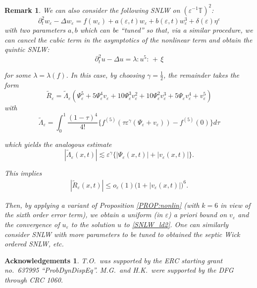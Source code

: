 \documentclass[letterpaper, 11pt,  reqno]{amsart}
\newtheorem{remark}[theorem]{Remark}
\newcommand{\1}{\hspace{0.5mm}\text{I}\hspace{0.5mm}}
\newcommand{\noi}{\noindent}
\newcommand{\T}{\mathbb{T}}
\newcommand{\Dl}{\Delta}
\newcommand{\eps}{\varepsilon}
\newcommand{\g}{\gamma}
\newcommand{\ld}{\lambda}
\newcommand{\Ld}{\Lambda}
\newcommand{\wt}{\widetilde}
\newcommand{\dt}{\partial_t}
\newcommand{\les}{\lesssim}
\newtheorem*{ackno}{Acknowledgements}
\numberwithin{equation}{section}
\numberwithin{theorem}{section}
\begin{document}
\begin{remark}\rm
We can also consider  the following  SNLW 
on $(\eps^{- 1} \T)^2$: 
\[ \dt^2 w_\eps- \Dl w_\eps  = f (w_\eps) + a (\eps, t) w_\eps 
+ b   (\eps, t) w_\eps^3 + \delta (\eps) \eta^\eps \]
  with two parameters $a, b$ which can be ``tuned'' 
  so that,  via a similar procedure, 
  we can cancel  the cubic term in the asymptotics of the nonlinear term 
  and obtain the  quintic SNLW: 
    \begin{equation}
\dt^2 u - \Dl  u = \lambda : \!u^5 \!: \, + \, \xi
    \label{SNLW_ld2}
  \end{equation}

\noi
for some $\ld = \ld(f)$.
  In this case, by choosing $\g = \frac 12$, 
    the remainder  takes the  form
  \[ \wt{R}_{\eps} = \wt{\Lambda}_{\eps} 
     (\Psi_{\eps}^5 + 5 \Psi_{\eps}^4 v_{\eps} + 10
     \Psi_{\eps}^3 v_{\eps}^2 + 10 \Psi_{\eps}^2
     v_{\eps}^3 + 5 \Psi_{\eps} v_{\eps}^4 +
     v_{\eps}^5) \]
  with
  \[ \wt{\Lambda}_{\eps} = \int_0^1 \frac{(1 - \tau)^4}{4!} 
     \big\{f^{(5)} (\tau \eps^{\gamma} (\Psi_{\eps} +
     v_{\eps})) - f^{(5)} (0)\big\} d \tau \]


\noi
  which yields the analogous estimate
  \[| \wt \Ld_\eps (x, t) | \les \eps^{\gamma} 
\big\{|    \Psi_{\eps} (x, t) | + | v_{\eps} (x, t) |\big\} .   \]
 
 \noi
 This implies
\begin{align*} | \wt R_{\eps} (x, t ) | \leq o_{\eps} (1) \big(1 + |   v_{\eps} (x, t) |\big)^6 . 
\end{align*}


 
 \noi
 Then, by applying 
 a variant of Proposition \ref{PROP:nonlin} 
(with $k = 6$ in view of the sixth order error term), 
 we obtain a uniform (in $\eps$) a priori bound on $v_\eps$
 and the convergence of $u_\eps$ to the solution $u$
 to \eqref{SNLW_ld2}.
 One can similarly consider SNLW with more parameters to be tuned
 to obtained the septic Wick ordered SNLW, etc.
 
 
\end{remark}

\begin{ackno}\rm
T.O.~was supported by the ERC starting grant 
no.~637995 ``ProbDynDispEq''.
M.G.~and H.K.~were supported by the DFG through CRC 1060.

\end{ackno}
\end{document}
